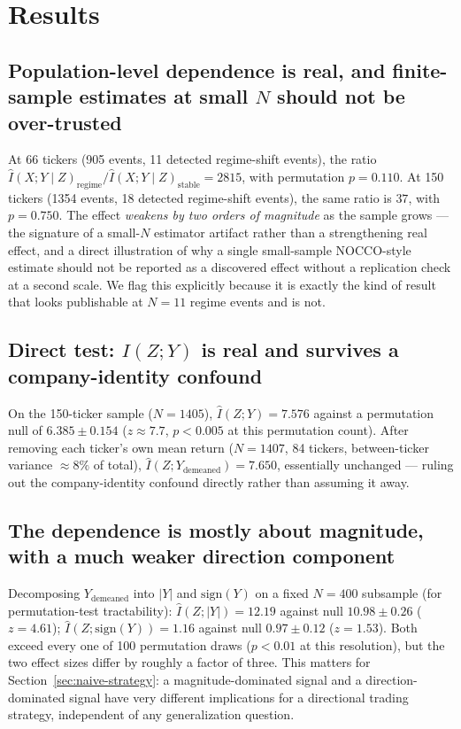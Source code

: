 \documentclass[11pt]{article}
\begin{document}
\section{Results}
\label{sec:results}

\subsection{Population-level dependence is real, and finite-sample estimates at small $N$ should not be over-trusted}
\label{sec:small-n}

At 66 tickers (905 events, 11 detected regime-shift events), the ratio $\hat{I}(X;Y\mid Z)_{\text{regime}} / \hat{I}(X;Y\mid Z)_{\text{stable}} = 2815$, with permutation $p=0.110$. At 150 tickers (1354 events, 18 detected regime-shift events), the same ratio is $37$, with $p=0.750$. The effect \emph{weakens by two orders of magnitude} as the sample grows --- the signature of a small-$N$ estimator artifact rather than a strengthening real effect, and a direct illustration of why a single small-sample NOCCO-style estimate should not be reported as a discovered effect without a replication check at a second scale. We flag this explicitly because it is exactly the kind of result that looks publishable at $N=11$ regime events and is not.

\subsection{Direct test: $I(Z;Y)$ is real and survives a company-identity confound}

On the 150-ticker sample ($N=1405$), $\hat{I}(Z;Y)=7.576$ against a permutation null of $6.385\pm0.154$ ($z\approx7.7$, $p<0.005$ at this permutation count). After removing each ticker's own mean return ($N=1407$, 84 tickers, between-ticker variance $\approx 8\%$ of total), $\hat{I}(Z;Y_{\text{demeaned}})=7.650$, essentially unchanged --- ruling out the company-identity confound directly rather than assuming it away.

\subsection{The dependence is mostly about magnitude, with a much weaker direction component}

Decomposing $Y_{\text{demeaned}}$ into $|Y|$ and $\mathrm{sign}(Y)$ on a fixed $N=400$ subsample (for permutation-test tractability): $\hat{I}(Z;|Y|)=12.19$ against null $10.98\pm0.26$ ($z=4.61$); $\hat{I}(Z;\mathrm{sign}(Y))=1.16$ against null $0.97\pm0.12$ ($z=1.53$). Both exceed every one of 100 permutation draws ($p<0.01$ at this resolution), but the two effect sizes differ by roughly a factor of three. This matters for Section~\ref{sec:naive-strategy}: a magnitude-dominated signal and a direction-dominated signal have very different implications for a directional trading strategy, independent of any generalization question.
\end{document}
